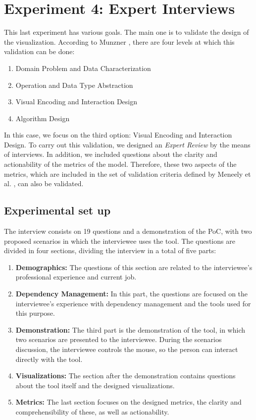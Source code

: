 \section{Experiment 4: Expert Interviews}
This last experiment has various goals. The main one is to validate the design of the visualization. According to Munzner \cite{Munzner2009}, there are four levels at which this validation can be done:

\begin{enumerate}
  \item Domain Problem and Data Characterization
  \item Operation and Data Type Abstraction
  \item Visual Encoding and Interaction Design
  \item Algorithm Design
\end{enumerate}

In this case, we focus on the third option: Visual Encoding and Interaction Design. To carry out this validation, we designed an \textit{Expert Review} by the means of interviews. In addition, we included questions about the clarity and actionability of the metrics of the model. Therefore, these two aspects of the metrics, which are included in the set of validation criteria defined by Meneely et al. \cite{Meneely2012}, can also be validated.

\subsection{Experimental set up}
The interview consists on 19 questions and a demonstration of the PoC, with two proposed scenarios in which the interviewee uses the tool. The questions are divided in four sections, dividing the interview in a total of five parts:

\begin{enumerate}
  \item \textbf{Demographics:} The questions of this section are related to the interviewee's professional experience and current job.
  \item \textbf{Dependency Management:} In this part, the questions are focused on the interviewee's experience with dependency management and the tools used for this purpose.
  \item \textbf{Demonstration:} The third part is the demonstration of the tool, in which two scenarios are presented to the interviewee. During the scenarios discussion, the interviewee controls the mouse, so the person can interact directly with the tool.
  \item \textbf{Visualizations:} The section after the demonstration contains questions about the tool itself and the designed visualizations.
  \item \textbf{Metrics:} The last section focuses on the designed metrics, the clarity and comprehensibility of these, as well as actionability.
\end{enumerate}

